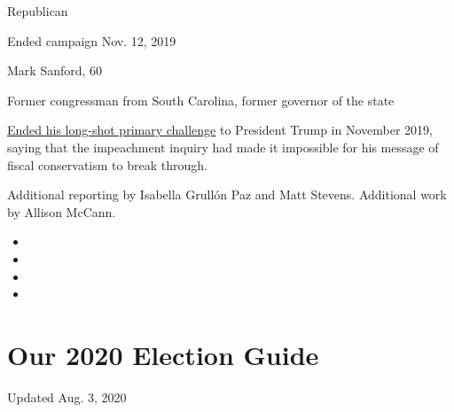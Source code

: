 Republican

Ended campaign Nov. 12, 2019

Mark Sanford, 60

Former congressman from South Carolina, former governor of the state

\href{https://www.nytimes3xbfgragh.onion/2019/11/12/us/politics/mark-sanford-2020.html}{Ended
his long-shot primary challenge} to President Trump in November 2019,
saying that the impeachment inquiry had made it impossible for his
message of fiscal conservatism to break through.

Additional reporting by Isabella Grullón Paz and Matt Stevens.
Additional work by Allison McCann.

\begin{itemize}
\item
\item
\item
\item
\end{itemize}

\hypertarget{our-2020-election-guide}{%
\section{Our 2020 Election Guide}\label{our-2020-election-guide}}

Updated Aug. 3, 2020

